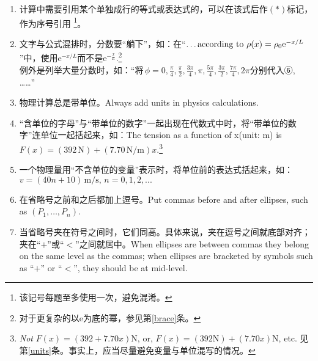 \documentclass[11pt, a4paper, titlepage]{article}
\newcommand{\Newton}{\mathrm{N}} %
\begin{document}
\begin{enumerate}
\begin{table}[h!]
\begin{threeparttable}

        \end{threeparttable}
    \end{table}

\item 计算中需要引用某个单独成行的等式或表达式的，可以在该式后作$(*)$标记，作为序号引用
    \footnote{该记号每题至多使用一次，避免混淆。}。

\item 文字与公式混排时，分数要“躺下”，如：在``$\text{\dots according to}\ \rho(x) = \rho_{0}\mathrm{e}^{-x/L}$''中，使用$\mathrm{e}^{-x/L}$而不是$\mathrm{e}^{-\frac{x}{L}}$.\footnote{对于更复杂的以$\mathrm{e}$为底的幂，参见第\ref{brace}条。}\\
    例外是列举大量分数时，如：“将$\, \phi = 0, \frac{\pi}{4}, \frac{\pi}{2}, \frac{3\pi}{4}, \pi, \frac{5\pi}{4}, \frac{3\pi}{2}, \frac{7\pi}{4}, 2\pi$分别代入⑥, ……”

\item\label{units}物理计算总是带单位。Always add units in physics calculations.

\item “含单位的字母”与“带单位的数字”一起出现在代数式中时，将“带单位的数字”连单位一起括起来，如：The tension as a function of x{\scriptsize(unit: m)} is $F(x) = (392\,\Newton) + (7.70\,\Newton/\mathrm{m})x$.\footnote{\emph{Not} $F(x) = (392 + 7.70x)\Newton$, or, $F(x) = (392\Newton) + (7.70x)\Newton$, etc. 见第\ref{units}条。事实上，应当尽量避免变量与单位混写的情况。}

\item 一个物理量用“不含单位的变量”表示时，将单位前的表达式括起来，如：$v = (40n + 10) \, \mathrm{m/s},\, n = 0,1,2,...$

\item 在省略号之前和之后都加上逗号。Put commas before and after ellipses, such as $(P_{1},\dots, P_{n})$.

\item 当省略号夹在符号之间时，它们同高。具体来说，夹在逗号之间就底部对齐；夹在``$+$''或``$<$''之间就居中。When ellipses are between commas they belong on the same level as the commas; when ellipses are bracketed by symbols such as ``$+$'' or ``$<$'', they should be at mid-level.





\end{enumerate}
\end{document}
